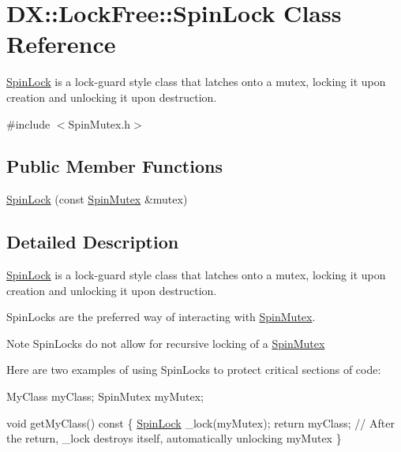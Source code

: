 \hypertarget{class_d_x_1_1_lock_free_1_1_spin_lock}{\section{D\-X\-:\-:Lock\-Free\-:\-:Spin\-Lock Class Reference}
\label{class_d_x_1_1_lock_free_1_1_spin_lock}
}


\hyperlink{class_d_x_1_1_lock_free_1_1_spin_lock}{Spin\-Lock} is a lock-\/guard style class that latches onto a mutex, locking it upon creation and unlocking it upon destruction.  




{\ttfamily \#include $<$Spin\-Mutex.\-h$>$}

\subsection*{Public Member Functions}
\begin{DoxyCompactItemize}
\item 
\hyperlink{class_d_x_1_1_lock_free_1_1_spin_lock_ad45dfee6c7aa94a6b6f195f1dc2f9e57}{Spin\-Lock} (const \hyperlink{class_d_x_1_1_lock_free_1_1_spin_mutex}{Spin\-Mutex} \&mutex)
\end{DoxyCompactItemize}


\subsection{Detailed Description}
\hyperlink{class_d_x_1_1_lock_free_1_1_spin_lock}{Spin\-Lock} is a lock-\/guard style class that latches onto a mutex, locking it upon creation and unlocking it upon destruction. 

Spin\-Locks are the preferred way of interacting with \hyperlink{class_d_x_1_1_lock_free_1_1_spin_mutex}{Spin\-Mutex}.

\begin{DoxyNote}{Note}
Spin\-Locks do not allow for recursive locking of a \hyperlink{class_d_x_1_1_lock_free_1_1_spin_mutex}{Spin\-Mutex}
\end{DoxyNote}
Here are two examples of using Spin\-Locks to protect critical sections of code\-: 
\begin{DoxyCode}
MyClass myClass;
SpinMutex myMutex;

\textcolor{keywordtype}{void} getMyClass()\textcolor{keyword}{ const}
\textcolor{keyword}{}\{
    \hyperlink{class_d_x_1_1_lock_free_1_1_spin_lock_ad45dfee6c7aa94a6b6f195f1dc2f9e57}{SpinLock} \_lock(myMutex);
    \textcolor{keywordflow}{return} myClass; \textcolor{comment}{// After the return, \_lock destroys itself, automatically unlocking myMutex}
\}
\end{DoxyCode}



